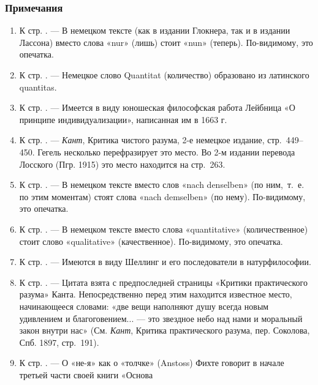 \clearpage\subsubsection{Примечания}
\bigskip


\bigskip

\begin{enumerate}
\printpagenotes




\item \label{bkm:Ref474665714}К стр. \pageref{bkm:bm35}. — В немецком тексте
(как в издании Глокнера, так и в издании Лассона) вместо слова «nur» (лишь)
стоит «nun» (теперь). По-видимому, это опечатка.
\item \label{bkm:Ref474665735}К стр. \pageref{bkm:bm36}. — Немецкое слово
Quantitat (количество) образовано из латинского quantitas.
\item \label{bkm:Ref474665753}К стр. \pageref{bkm:bm37}. — Имеется в виду
юношеская философская работа Лейбница «О принципе индивидуализации»,
написанная им в 1663 г.
\item \label{bkm:Ref474665775}К стр. \pageref{bkm:bm38}. — {\em Кант},
Критика чистого разума, 2-е немецкое издание, стр.~449–450. Гегель
несколько перефразирует это место. Во 2-м издании перевода Лосского (Пгр.
1915) это место находится на стр.~263.
\item \label{bkm:Ref474665791}К стр. \pageref{bkm:bm39}. — В немецком тексте
вместо слов «nach denselben» (по ним,~т.~е. по этим моментам) стоят слова
«nach demselben» (по нему). По-видимому, это опечатка.
\item \label{bkm:Ref474665796}К стр. \pageref{bkm:bm40}. — В немецком тексте
вместо слова «quantitative» (количественное) стоит слово «qualitative»
(качественное). По-видимому, это опечатка.
\item \label{bkm:Ref474665804}К стр. \pageref{bkm:bm41}. — Имеются в виду
Шеллинг и его последователи в натурфилософии.
\item \label{bkm:Ref474665813}К стр. \pageref{bkm:bm42}. — Цитата взята с
предпоследней страницы «Критики практического разума» Канта.
Непосредственно перед этим находится известное место, начинающееся словами:
«две вещи наполняют душу всегда новым удивлением и благоговением... — это
звездное небо над нами и моральный закон внутри нас» (См. {\em Кант},
Критика практического разума, пер. Соколова, Спб. 1897, стр.~191).
\item \label{bkm:Ref474665836}К стр. \pageref{bkm:bm43}. — О «не-я» как о
«толчке» (Anstoss) Фихте говорит в начале третьей части своей книги «Основа

\end{enumerate}
